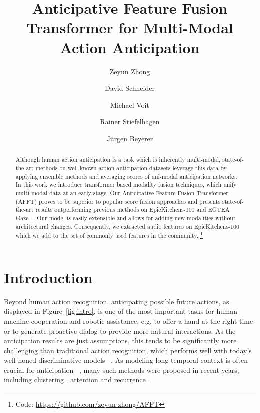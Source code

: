 \documentclass[10pt,twocolumn,letterpaper,dvipsnames]{article}
\begin{document}
\title{Anticipative Feature Fusion Transformer for Multi-Modal Action Anticipation}

\author[1,2\thanks{Equal contribution}]{Zeyun Zhong}
\author[2]{David Schneider}
\author[1]{Michael Voit}
\author[2]{Rainer Stiefelhagen}
\author[1,2]{Jürgen Beyerer}

\maketitle
\thispagestyle{empty}

\begin{abstract}
Although human action anticipation is a task which is inherently multi-modal, state-of-the-art methods on well known action anticipation datasets leverage this data by applying ensemble methods and averaging scores of uni-modal anticipation networks. In this work we introduce transformer based modality fusion techniques, which unify multi-modal data at an early stage. Our Anticipative Feature Fusion Transformer (AFFT) proves to be superior to popular score fusion approaches and presents state-of-the-art results outperforming previous methods on EpicKitchens-100 and EGTEA Gaze+. Our model is easily extensible and allows for adding new modalities without architectural changes. Consequently, we extracted audio features on EpicKitchens-100 which we add to the set of commonly used features in the community. \footnote{Code: \url{https://github.com/zeyun-zhong/AFFT}}
\end{abstract} \section{Introduction}
Beyond human action recognition, anticipating possible future actions, as displayed in Figure~\ref{fig:intro}, is one of the most important tasks for human machine cooperation and robotic assistance, e.g. to offer a hand at the right time or to generate proactive dialog to provide more natural interactions. As the anticipation results are just assumptions, this tends to be significantly more challenging than traditional action recognition, which performs well with today’s well-honed discriminative models
~\cite{feichtenhofer2019slowfast,liu2022video}.
As modeling long temporal context is often crucial for anticipation~ \cite{furnariWhatWouldYou2019,senerTemporalAggregateRepresentations2020,girdharAnticipativeVideoTransformer2021}, many such methods were proposed in recent years, including clustering \cite{girdhar2017actionvlad,miechLearnablePoolingContext2017}, attention \cite{senerTemporalAggregateRepresentations2020} and recurrence \cite{furnariWhatWouldYou2019}.
\end{document}
